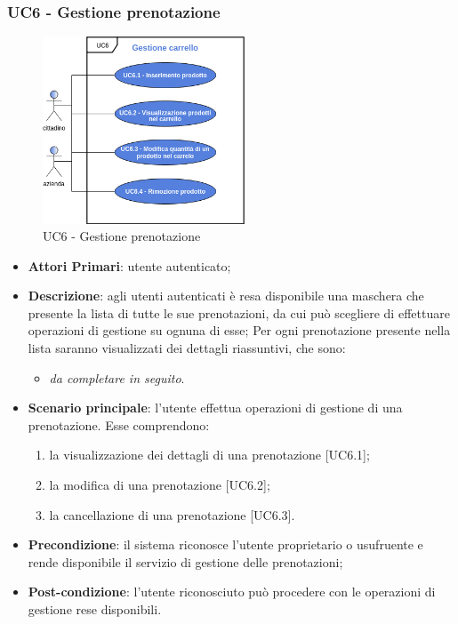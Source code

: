 \subsubsection{UC6 - Gestione prenotazione}
 \begin{figure}[h]
	\includegraphics[width=6cm]{res/images/UC6GestioneCarrello.png}
	\centering
	\caption{UC6 - Gestione prenotazione}
\end{figure}
\begin{itemize}
	\item \textbf{Attori Primari}: utente autenticato;
	\item \textbf{Descrizione}: agli utenti autenticati è resa disponibile una maschera che presente la lista di tutte le sue prenotazioni, da cui può scegliere di effettuare operazioni di gestione su ognuna di esse;
	Per ogni prenotazione presente nella lista saranno visualizzati dei dettagli riassuntivi, che sono:
	\begin{itemize}
		\item \textit{da completare in seguito}.
	\end{itemize}
	\item \textbf{Scenario principale}: l'utente effettua operazioni di gestione di una prenotazione. Esse comprendono:
	\begin{enumerate}[label=\alph*.]
		\item la visualizzazione dei dettagli di una prenotazione [UC6.1];
		\item la modifica di una prenotazione [UC6.2];
		\item la cancellazione di una prenotazione [UC6.3].
	\end{enumerate}
	\item \textbf{Precondizione}: il sistema riconosce l'utente proprietario o usufruente e rende disponibile il servizio di gestione delle prenotazioni;
	\item \textbf{Post-condizione}: l'utente riconosciuto può procedere con le operazioni di gestione rese disponibili.
\end{itemize} 
